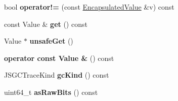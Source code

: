 \begin{DoxyCompactItemize}
\item 
\hypertarget{classjs_1_1_encapsulated_value_a911b4d13d995b3463fc53bed18f33519}{bool {\bfseries operator!=} (const \hyperlink{classjs_1_1_encapsulated_value}{Encapsulated\-Value} \&v) const }\label{classjs_1_1_encapsulated_value_a911b4d13d995b3463fc53bed18f33519}

\item 
\hypertarget{classjs_1_1_encapsulated_value_af687e0595b7dc48d9c009bbb207ff139}{const Value \& {\bfseries get} () const }\label{classjs_1_1_encapsulated_value_af687e0595b7dc48d9c009bbb207ff139}

\item 
\hypertarget{classjs_1_1_encapsulated_value_aa4448256613deaa55970414093d213d9}{Value $\ast$ {\bfseries unsafe\-Get} ()}\label{classjs_1_1_encapsulated_value_aa4448256613deaa55970414093d213d9}

\item 
\hypertarget{classjs_1_1_encapsulated_value_a4bf89cf1db0edd8ae0b2cecfd60ad55c}{{\bfseries operator const Value \&} () const }\label{classjs_1_1_encapsulated_value_a4bf89cf1db0edd8ae0b2cecfd60ad55c}

\item 
\hypertarget{classjs_1_1_encapsulated_value_a1eb95571b62c8245afb744d47ab2b31e}{J\-S\-G\-C\-Trace\-Kind {\bfseries gc\-Kind} () const }\label{classjs_1_1_encapsulated_value_a1eb95571b62c8245afb744d47ab2b31e}

\item 
\hypertarget{classjs_1_1_encapsulated_value_abf1c0919b5d5deaed6ec11f381e1e611}{uint64\-\_\-t {\bfseries as\-Raw\-Bits} () const }\label{classjs_1_1_encapsulated_value_abf1c0919b5d5deaed6ec11f381e1e611}

\end{DoxyCompactItemize}
